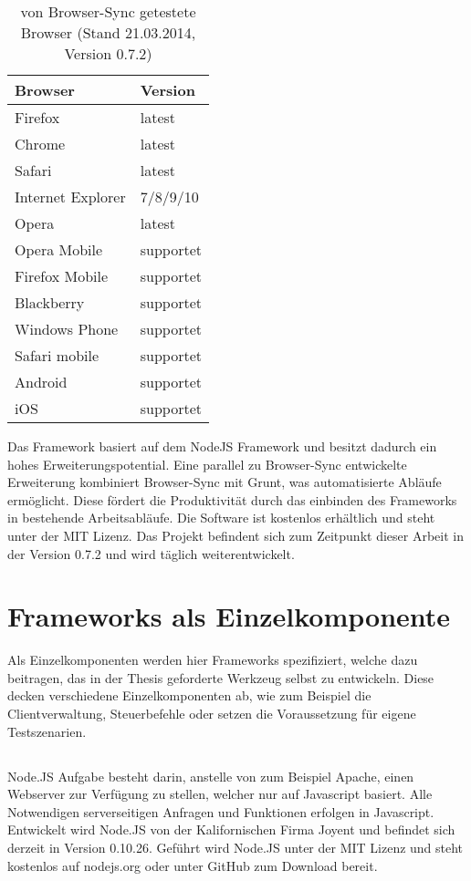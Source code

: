 		\begin{table}[H]
 		\centering
			\begin{tabular}{| p{5cm} | p{5cm} |}
			
			\hline
				Browser 	& 	Version\\
			\hline
			\hline
				Firefox	&	latest\\
				Chrome	&	latest\\
				Safari	&	latest\\
				Internet Explorer	&	7/8/9/10\\
				Opera	&	latest\\
				Opera Mobile	&	supportet\\
				Firefox Mobile	&	supportet\\
				Blackberry	&	supportet\\
				Windows Phone	&	supportet\\
				Safari mobile	&	supportet\\	
				Android	&	supportet\\
				iOS		&	supportet\\
				\hline
				\end{tabular}
			\caption{von Browser-Sync getestete Browser (Stand 21.03.2014, Version 0.7.2)}
	\end{table}
	
	Das Framework basiert auf dem NodeJS Framework und besitzt dadurch ein hohes Erweiterungspotential. Eine parallel zu 		Browser-Sync entwickelte Erweiterung kombiniert Browser-Sync mit Grunt, was automatisierte Abläufe ermöglicht. Diese fördert 	die Produktivität durch das einbinden des Frameworks in bestehende Arbeitsabläufe. Die Software ist kostenlos erhältlich und 		steht unter der MIT Lizenz. Das Projekt befindent sich zum Zeitpunkt dieser Arbeit in der Version 0.7.2 und wird täglich 			weiterentwickelt.

\pagebreak
\section{Frameworks als Einzelkomponente}
	Als Einzelkomponenten werden hier Frameworks spezifiziert, welche dazu beitragen, das in der Thesis geforderte Werkzeug 		selbst zu entwickeln. Diese decken verschiedene Einzelkomponenten ab, wie zum Beispiel die Clientverwaltung, Steuerbefehle 	oder setzen die Voraussetzung für eigene Testszenarien.
	
	\subsection{}
	Node.JS Aufgabe besteht darin, anstelle von zum Beispiel Apache, einen Webserver zur Verfügung zu stellen, welcher nur auf 		Javascript basiert. Alle Notwendigen serverseitigen Anfragen und Funktionen erfolgen in Javascript. Entwickelt wird Node.JS von 	der Kalifornischen Firma Joyent und befindet sich derzeit in Version 0.10.26. Geführt wird Node.JS unter der MIT Lizenz und 		steht kostenlos auf nodejs.org oder unter GitHub zum Download bereit.
	
